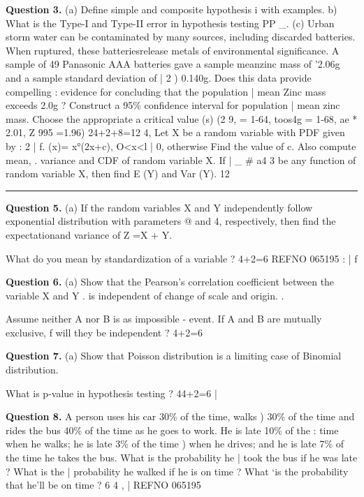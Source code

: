 \documentclass[11pt,a4paper]{article}
\begin{document}
\medskip\noindent\textbf{Question 3.} (a) Define simple and composite hypothesis i
with examples.
{b) What is the Type-I and Type-II error in
hypothesis testing PP
\_. (c) Urban storm water can be contaminated
by many sources, including discarded
batteries. When ruptured, these
batteriesrelease metals of environmental
significance. A sample of 49 Panasonic AAA
batteries gave a sample meanzinc mass of
'2.06g and a sample standard deviation of
| 2
) 0.140g. Does this data provide compelling
: evidence for concluding that the population
| mean Zinc mass exceeds 2.0g ? Construct
a 95\% confidence interval for population
| mean zinc mass. Choose the appropriate
a critical value (s) (2 9, = 1-64, toos4g = 1-68,
} ae * 2.01, Z 995 =1.96) 24+2+8=12
4, Let X be a random variable with PDF given by
: 2
| f. (x)= x°(2x+c), O<x<l |
0, otherwise
Find the value of c. Also compute mean,
. variance and CDF of random variable X. If |
\_  \# a4 3 be any function of random variable X,
then find E (Y) and Var (Y). 12

\bigskip{}
\rule{\linewidth}{0.4pt}\smallskip

\medskip\noindent\textbf{Question 5.} (a) If the random variables X and Y
independently follow exponential
distribution with parameters @ and 4,
respectively, then find the expectationand
variance of Z =X + Y.
\begin{parts}
  \item What do you mean by standardization of a
  variable ? 4+2=6
  REFNO 065195 : | f
\end{parts}

\medskip\noindent\textbf{Question 6.} (a) Show that the Pearson's correlation
coefficient between the variable X and Y
. is independent of change of scale and
origin. .
\begin{parts}
  \item Assume neither A nor B is as impossible -
  event. If A and B are mutually exclusive, f
  will they be independent ? 4+2=6
\end{parts}

\medskip\noindent\textbf{Question 7.} (a) Show that Poisson distribution is a limiting
case of Binomial distribution.
\begin{parts}
  \item What is p-value in hypothesis testing ?
  44+2=6 |
\end{parts}

\medskip\noindent\textbf{Question 8.} A person uses his car 30\% of the time, walks )
30\% of the time and rides the bus 40\% of the
time as he goes to work. He is late 10\% of the :
time when he walks; he is late 3\% of the time )
when he drives; and he is late 7\% of the time
he takes the bus. What is the probability he |
took the bus if he was late ? What is the |
probability he walked if he is on time ? What
‘is the probability that he'll be on time ? 6
4 ,
| REFNO 065195
\end{document}
